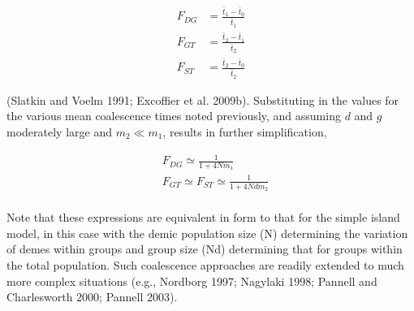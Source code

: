 \documentclass{article}
\begin{document}
\begin{equation}
\begin{aligned}F_{DG}&=\frac{\bar{t}_{1}-\bar{t}_{0}}{\bar{t}_{1}}\\F_{GT}&=\frac{\bar{t}_{2}-\bar{t}_{1}}{\bar{t}_{2}}\\F_{ST}&=\frac{\bar{t}_{2}-\bar{t}_{0}}{\bar{t}_{2}}\end{aligned}
\tag{2.47a}
\label{eq:2_47a}
\end{equation}

(Slatkin and Voelm 1991; Excoffier et al. 2009b). Substituting in the values for the various mean coalescence times noted previously, and assuming $d$ and $g$ moderately large and $m_{2} \ll m_{1}$, results in further simplification,

\begin{equation}
\begin{aligned}&F_{DG}\simeq\frac{1}{1+4Nm_{1}}\\&F_{GT}\simeq F_{ST}\simeq\frac{1}{1+4Ndm_{2}}\\ \end{aligned}
\tag{2.47b}
\label{eq:2_47b}
\end{equation}

Note that these expressions are equivalent in form to that for the simple island model, in this case with the demic population size (N) determining the variation of demes within groups and group size (Nd) determining that for groups within the total population. Such coalescence approaches are readily extended to much more complex situations (e.g., Nordborg 1997; Nagylaki 1998; Pannell and Charlesworth 2000; Pannell 2003).
\end{document}
